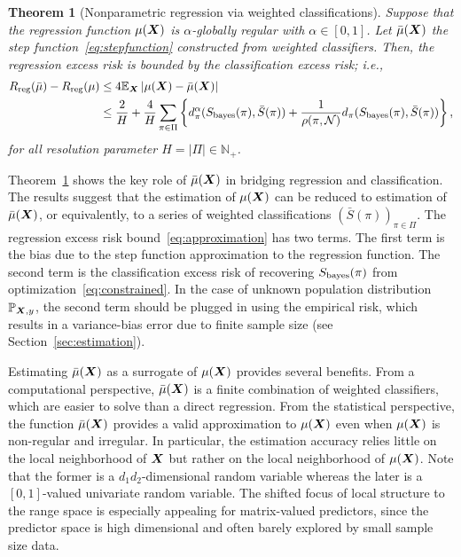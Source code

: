 \documentclass[11pt]{article}
\theoremstyle{plain}
\newtheorem{thm}{Theorem}
\theoremstyle{definition}
\def\bayesS{S_{\textup{bayes}}}
\begin{document}
\begin{thm}[Nonparametric regression via weighted classifications]\label{thm:twobounds} Suppose that the regression function $\mu(\bm X)$ is $\alpha$-globally regular with $\alpha\in[0,1]$. Let $\bar \mu(\bm X)$ the step function~\eqref{eq:stepfunction} constructed from weighted classifiers. Then, the regression excess risk is bounded by the classification excess risk; i.e.,
\begin{align}\label{eq:approximation}
R_{\textup{reg}}(\bar \mu) - R_{\textup{reg}}(\mu)&\leq 4\mathbb{E}_{\mX}\left|  \mu(\mX)-\bar \mu(\mX)\right|\notag\\
&\leq {2\over H}+ \frac{4}{H}\sum_{\pi\in\Pi}\left\{d_\pi^{\alpha}(\bayesS(\pi),\bar S(\pi))+ {1\over\rho(\pi, \tN)} d_\pi(\bayesS(\pi),\bar S(\pi))\right\},
\end{align}
for all resolution parameter $H=|\Pi|\in \mathbb{N}_{+}$. 

\end{thm}

Theorem~\ref{thm:twobounds} shows the key role of $\bar \mu(\bm X)$ in bridging regression and classification. The results suggest that the estimation of $\mu(\bm X)$ can be reduced to estimation of $\bar \mu(\bm X)$, or equivalently, to a series of weighted classifications $(\bar S(\pi))_{\pi\in\Pi}$. The regression excess risk bound~\eqref{eq:approximation} has two terms. The first term is the bias due to the step function approximation to the regression function. The second term is the classification excess risk of recovering $\bayesS(\pi)$ from optimization~\eqref{eq:constrained}. In the case of unknown population distribution $\mathbb{P}_{\bm X,y}$, the second term should be plugged in using the empirical risk, which results in a variance-bias error due to finite sample size (see Section~\ref{sec:estimation}). 

Estimating $\bar \mu(\bm X)$ as a surrogate of $\mu(\bm X)$ provides several benefits. From a computational perspective, $\bar \mu(\bm X)$ is a finite combination of weighted classifiers, which are easier to solve than a direct regression. From the statistical perspective, the function $\bar \mu(\bm X)$ provides a valid approximation to $\mu(\bm X)$ even when $\mu(\bm X)$ is non-regular and irregular. In particular, the estimation accuracy relies little on the local neighborhood of $\bm X$ but rather on the local neighborhood of $\mu(\bm X)$. Note that the former is a $d_1d_2$-dimensional random variable whereas the later is a $[0,1]$-valued univariate random variable. The shifted focus of local structure to the range space is especially appealing for matrix-valued predictors, since the predictor space is high dimensional and often barely explored by small sample size data.  
\end{document}
